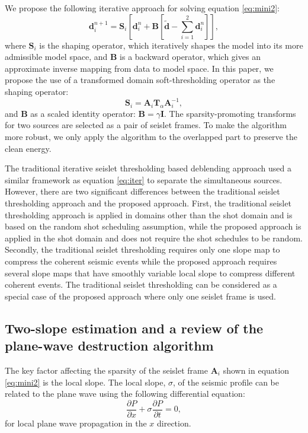 We propose the following iterative approach for solving equation \ref{eq:mini2}:
\begin{equation}
\label{eq:iter}
\mathbf{d}_{i}^{n+1} = \mathbf{S}_i [\mathbf{d}_{i}^{n} + \mathbf{B}[\tilde{\mathbf{d}} - \sum_{i=1}^{2}\mathbf{d}_i^n ] ],
\end{equation}
where $\mathbf{S}_i$ is the shaping operator, which iteratively shapes the model into its more admissible model space, and $\mathbf{B}$ is a backward operator, which gives an approximate inverse mapping from data to model space. In this paper, we propose the use of a transformed domain soft-thresholding operator as the shaping operator:
\begin{equation}
\label{eq:shape}
 \mathbf{S}_i = \mathbf{A}_i \mathbf{T}_{\alpha} \mathbf{A}_i^{-1},
\end{equation}
and $\mathbf{B}$ as a scaled identity operator: $\mathbf{B}=\gamma\mathbf{I}$. The sparsity-promoting transforms for two sources are selected as a pair of seislet frames. To make the algorithm more robust, we only apply the algorithm to the overlapped part to preserve the clean energy.

The traditional iterative seislet thresholding based deblending approach \cite{yangkang20142} used a similar framework as equation \ref{eq:iter} to separate the simultaneous sources. However, there are two significant differences between the traditional seislet thresholding approach and the proposed approach. First, the traditional seislet thresholding approach is applied in domains other than the shot domain and is based on the random shot scheduling assumption, while the proposed approach is applied in the shot domain and does not require the shot schedules to be random. Secondly, the traditional seislet thresholding requires only one slope map to compress the coherent seismic events while the proposed approach requires several slope maps that have smoothly variable local slope to compress different coherent events. The traditional seislet thresholding can be considered as a special case of the proposed approach where only one seislet frame is used.

\subsection{Two-slope estimation and a review of the plane-wave destruction algorithm}
The key factor affecting the sparsity of the seislet frame $\mathbf{A}_i$ shown in equation \ref{eq:mini2} is the local slope. The local slope, $\sigma$, of the seismic profile can be related to the plane wave using the following differential equation:
\begin{equation}
\label{eq:plane}
\frac{\partial P}{\partial x} + \sigma \frac{\partial P}{\partial t} = 0,
\end{equation}
for local plane wave propagation in the $x$ direction.

